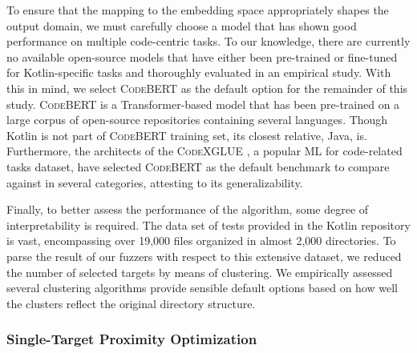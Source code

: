 To ensure that the mapping to the embedding space appropriately
shapes the output domain, we must carefully choose a model
that has shown good performance on multiple code-centric tasks.
To our knowledge, there are currently no available open-source models
that have either been pre-trained or fine-tuned for Kotlin-specific
tasks and thoroughly evaluated in an empirical study.
With this in mind, we select \textsc{CodeBERT} \cite{feng2020codebert}
as the default option for the remainder of this study.
\textsc{CodeBERT} is a Transformer-based \cite{vaswani2017attention} model
that has been pre-trained on a large corpus
of open-source repositories containing several languages.
Though Kotlin is not part of \textsc{CodeBERT} training set,
its closest relative, Java, is.
Furthermore, the architects of the \textsc{CodeXGLUE} \cite{lu2021codexglue}
, a popular \gls{ML} for code-related tasks dataset,
 have selected \textsc{CodeBERT} as the default
benchmark to compare against in several categories, attesting to
its generalizability.

Finally, to better assess the performance of the algorithm,
some degree of interpretability is required.
The data set of tests provided in the Kotlin repository
is vast, encompassing over 19,000 files
organized in almost 2,000 directories.
To parse the result of our fuzzers with respect
to this extensive dataset, we reduced the number of
selected targets by means of clustering.
We empirically assessed several clustering algorithms
provide sensible default options based on how well
the clusters reflect the original directory structure.

\subsubsection{Single-Target Proximity Optimization}

